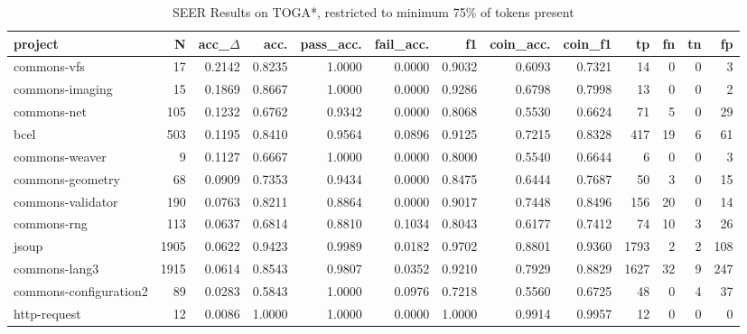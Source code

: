 \begin{table*}
\centering
\caption{SEER Results on TOGA*, restricted to minimum 75\% of tokens present}
\label{tab:toga_results_25}
\begin{tabular}{lrrrrrrrrrrrr}
\toprule
                project &      N &  acc\_$\Delta$ &    acc. &  pass\_acc. &  fail\_acc. &      f1 &  coin\_acc. &  coin\_f1 &     tp &   fn &  tn &    fp \\
\midrule
            commons-vfs &     17 &      0.2142 &  0.8235 &     1.0000 &     0.0000 &  0.9032 &     0.6093 &   0.7321 &     14 &    0 &   0 &     3 \\
        commons-imaging &     15 &      0.1869 &  0.8667 &     1.0000 &     0.0000 &  0.9286 &     0.6798 &   0.7998 &     13 &    0 &   0 &     2 \\
            commons-net &    105 &      0.1232 &  0.6762 &     0.9342 &     0.0000 &  0.8068 &     0.5530 &   0.6624 &     71 &    5 &   0 &    29 \\
                   bcel &    503 &      0.1195 &  0.8410 &     0.9564 &     0.0896 &  0.9125 &     0.7215 &   0.8328 &    417 &   19 &   6 &    61 \\
         commons-weaver &      9 &      0.1127 &  0.6667 &     1.0000 &     0.0000 &  0.8000 &     0.5540 &   0.6644 &      6 &    0 &   0 &     3 \\
       commons-geometry &     68 &      0.0909 &  0.7353 &     0.9434 &     0.0000 &  0.8475 &     0.6444 &   0.7687 &     50 &    3 &   0 &    15 \\
      commons-validator &    190 &      0.0763 &  0.8211 &     0.8864 &     0.0000 &  0.9017 &     0.7448 &   0.8496 &    156 &   20 &   0 &    14 \\
            commons-rng &    113 &      0.0637 &  0.6814 &     0.8810 &     0.1034 &  0.8043 &     0.6177 &   0.7412 &     74 &   10 &   3 &    26 \\
                  jsoup &   1905 &      0.0622 &  0.9423 &     0.9989 &     0.0182 &  0.9702 &     0.8801 &   0.9360 &   1793 &    2 &   2 &   108 \\
          commons-lang3 &   1915 &      0.0614 &  0.8543 &     0.9807 &     0.0352 &  0.9210 &     0.7929 &   0.8829 &   1627 &   32 &   9 &   247 \\
 commons-configuration2 &     89 &      0.0283 &  0.5843 &     1.0000 &     0.0976 &  0.7218 &     0.5560 &   0.6725 &     48 &    0 &   4 &    37 \\
           http-request &     12 &      0.0086 &  1.0000 &     1.0000 &     0.0000 &  1.0000 &     0.9914 &   0.9957 &     12 &    0 &   0 &     0 \\

\end{tabular}
\end{table*}

